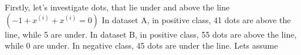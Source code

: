 \begin{answer}
 Firstly, let’s investigate dots, that lie under and above the line $(−1+x^{(i)} +x^{(i)} = 0)$ In dataset A, in positive class, 41 dots are above the line, while 5 are under. In dataset B, in
positive class, 55 dots are above the line, while 0 are under. In negative class, 45 dots are under
the line. Lets assume
\end{answer}
